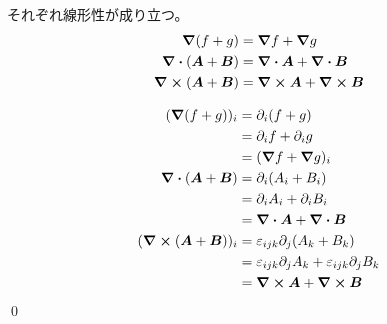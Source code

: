 \documentclass[uplatex,dvipdfmx,a4paper,11pt]{jlreq}
\makeatletter
\newcommand{\rot}{\curl}
\theoremstyle{definition}
\renewenvironment{proof}[1][\proofname]{\par
  \normalfont
  \topsep6\p@\@plus6\p@ \trivlist
  \item[\hskip\labelsep{\bfseries #1}\@addpunct{\bfseries}]\ignorespaces\quad\par
}{%
  \qed\endtrivlist\@endpefalse
}
\renewcommand\proofname{証明}
\makeatother
\begin{document}
\begin{theorem}[勾配・発散・回転の線形性]
  それぞれ線形性が成り立つ。
  \begin{align}
    \grad{(f+g)}          & = \grad{f} + \grad{g}         \\
    \div{(\bm{A}+\bm{B})} & = \div{\bm{A}} + \div{\bm{B}} \\
    \rot{(\bm{A}+\bm{B})} & = \rot{\bm{A}} + \rot{\bm{B}}
  \end{align}
\end{theorem}
\begin{proof}
  \begin{align}
    (\grad{(f+g)})_i            & = \partial_i(f+g)                                                 \\
                                & = \partial_i f + \partial_i g                                     \\
                                & = (\grad{f} + \grad{g})_i                                         \\
    \div{(\bm{A}+\bm{B})}       & = \partial_i(A_i + B_i)                                           \\
                                & = \partial_i A_i + \partial_i B_i                                 \\
                                & = \div{\bm{A}}+\div{\bm{B}}                                       \\
    (\rot{(\bm{A} + \bm{B})})_i & = \varepsilon_{ijk}\partial_j(A_k + B_k)                          \\
                                & = \varepsilon_{ijk}\partial_jA_k + \varepsilon_{ijk}\partial_jB_k \\
                                & = \rot{\bm{A}} + \rot{\bm{B}}
  \end{align}
\end{proof}
\end{document}
